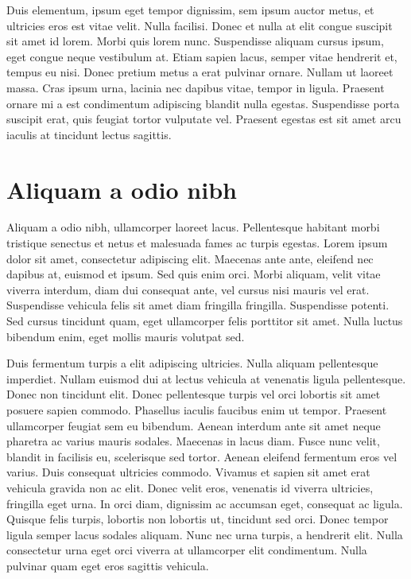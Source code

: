Duis elementum, ipsum eget tempor dignissim, sem ipsum auctor metus, et ultricies eros est vitae velit.
Nulla facilisi.
Donec et nulla at elit congue suscipit sit amet id lorem.
Morbi quis lorem nunc.
Suspendisse aliquam cursus ipsum, eget congue neque vestibulum at.
Etiam sapien lacus, semper vitae hendrerit et, tempus eu nisi.
Donec pretium metus a erat pulvinar ornare.
Nullam ut laoreet massa.
Cras ipsum urna, lacinia nec dapibus vitae, tempor in ligula.
Praesent ornare mi a est condimentum adipiscing blandit nulla egestas.
Suspendisse porta suscipit erat, quis feugiat tortor vulputate vel.
Praesent egestas est sit amet arcu iaculis at tincidunt lectus sagittis.

\section{Aliquam a odio nibh}
Aliquam a odio nibh, ullamcorper laoreet lacus.
Pellentesque habitant morbi tristique senectus et netus et malesuada fames ac turpis egestas.
Lorem ipsum dolor sit amet, consectetur adipiscing elit.
Maecenas ante ante, eleifend nec dapibus at, euismod et ipsum.
Sed quis enim orci.
Morbi aliquam, velit vitae viverra interdum, diam dui consequat ante, vel cursus nisi mauris vel erat.
Suspendisse vehicula felis sit amet diam fringilla fringilla.
Suspendisse potenti.
Sed cursus tincidunt quam, eget ullamcorper felis porttitor sit amet.
Nulla luctus bibendum enim, eget mollis mauris volutpat sed.

Duis fermentum turpis a elit adipiscing ultricies.
Nulla aliquam pellentesque imperdiet.
Nullam euismod dui at lectus vehicula at venenatis ligula pellentesque.
Donec non tincidunt elit.
Donec pellentesque turpis vel orci lobortis sit amet posuere sapien commodo.
Phasellus iaculis faucibus enim ut tempor.
Praesent ullamcorper feugiat sem eu bibendum.
Aenean interdum ante sit amet neque pharetra ac varius mauris sodales.
Maecenas in lacus diam.
Fusce nunc velit, blandit in facilisis eu, scelerisque sed tortor.
Aenean eleifend fermentum eros vel varius.
Duis consequat ultricies commodo.
Vivamus et sapien sit amet erat vehicula gravida non ac elit.
Donec velit eros, venenatis id viverra ultricies, fringilla eget urna.
In orci diam, dignissim ac accumsan eget, consequat ac ligula.
Quisque felis turpis, lobortis non lobortis ut, tincidunt sed orci.
Donec tempor ligula semper lacus sodales aliquam.
Nunc nec urna turpis, a hendrerit elit.
Nulla consectetur urna eget orci viverra at ullamcorper elit condimentum.
Nulla pulvinar quam eget eros sagittis vehicula.

